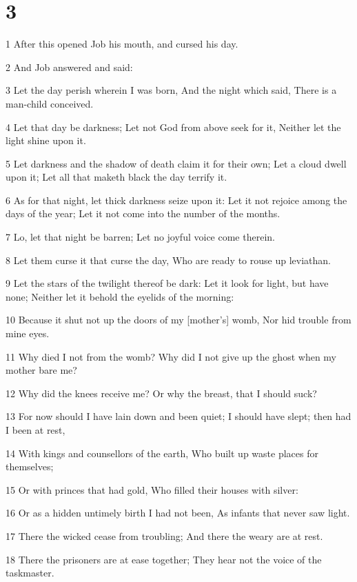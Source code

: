 \chapter{3}

\par 1 After this opened Job his mouth, and cursed his day.
\par 2 And Job answered and said:
\par 3 Let the day perish wherein I was born, And the night which said, There is a man-child conceived.
\par 4 Let that day be darkness; Let not God from above seek for it, Neither let the light shine upon it.
\par 5 Let darkness and the shadow of death claim it for their own; Let a cloud dwell upon it; Let all that maketh black the day terrify it.
\par 6 As for that night, let thick darkness seize upon it: Let it not rejoice among the days of the year; Let it not come into the number of the months.
\par 7 Lo, let that night be barren; Let no joyful voice come therein.
\par 8 Let them curse it that curse the day, Who are ready to rouse up leviathan.
\par 9 Let the stars of the twilight thereof be dark: Let it look for light, but have none; Neither let it behold the eyelids of the morning:
\par 10 Because it shut not up the doors of my [mother's] womb, Nor hid trouble from mine eyes.
\par 11 Why died I not from the womb? Why did I not give up the ghost when my mother bare me?
\par 12 Why did the knees receive me? Or why the breast, that I should suck?
\par 13 For now should I have lain down and been quiet; I should have slept; then had I been at rest,
\par 14 With kings and counsellors of the earth, Who built up waste places for themselves;
\par 15 Or with princes that had gold, Who filled their houses with silver:
\par 16 Or as a hidden untimely birth I had not been, As infants that never saw light.
\par 17 There the wicked cease from troubling; And there the weary are at rest.
\par 18 There the prisoners are at ease together; They hear not the voice of the taskmaster.
